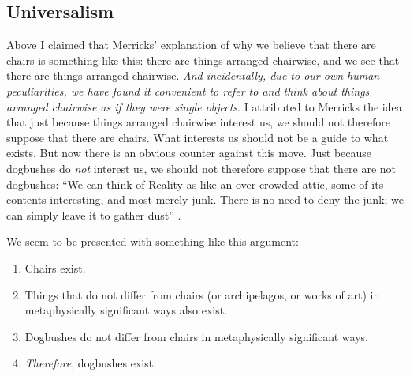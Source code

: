 \documentclass[11pt]{article}
\newenvironment{squote}{%
\begin{spacing}{1}
       	\begin{list}{}{%
\setlength{\labelwidth}{0pt}%
\rightmargin\leftmargin%
}
\item\relax
}{%
\end{list}%
\end{spacing}
}
\begin{document}
\begin{spacing}{1.25}


\section{Universalism}
\label{universalism}
Above I claimed that Merricks' explanation of why we believe that
there are chairs is something like this: there are things arranged
chairwise, and we see that there are things arranged chairwise.  {\em
  And incidentally, due to our own human peculiarities, we have found
  it convenient to refer to and think about things arranged chairwise
  as if they were single objects}.  I attributed to Merricks the idea
that just because things arranged chairwise interest us, we should not
therefore suppose that there are chairs.  What interests us should not
be a guide to what exists.  But now there is an obvious counter
against this move.  Just because dogbushes do {\em not} interest us,
we should not therefore suppose that there are not dogbushes: ``We can
think of Reality as like an over-crowded attic, some of its contents
interesting, and most merely junk.  There is no need to deny the junk;
we can simply leave it to gather dust'' \citep[167]{thomson1998a}.

We seem to be presented with something like this argument:

\begin{enumerate}[ref=(\arabic*)]
  \item Chairs exist. \label{u-1}
  \item Things that do not differ from chairs (or archipelagos, or
    works of art) in metaphysically significant ways also exist.
  \item Dogbushes do not differ from chairs in metaphysically
    significant ways.
  \item {\em Therefore}, dogbushes exist. \label{u-4}
\end{enumerate}


\end{spacing}
\end{document}
